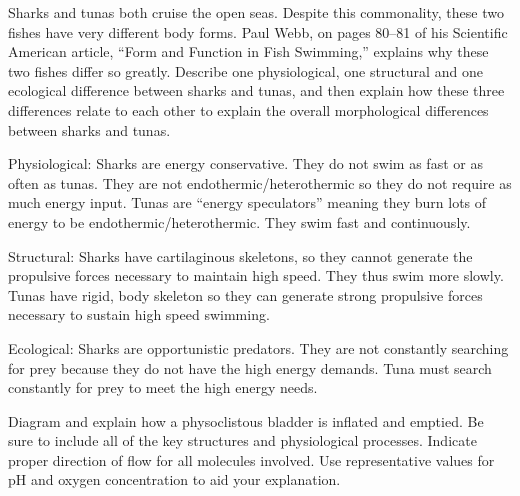 \documentclass[11pt, addpoints]{exam}
\begin{document}
\begin{questions}
\newpage

%

\question[15]
Sharks and tunas both cruise the open seas.  Despite this commonality, these two fishes have very different body forms.  Paul Webb, on pages 80--81 of his Scientific American article, “Form and Function in Fish Swimming,” explains why these two fishes differ so greatly.  Describe one physiological, one structural and one ecological difference between sharks and tunas, and then explain how these three differences relate to each other to explain the overall morphological differences between sharks and tunas.
	\begin{solution}
	Physiological: Sharks are energy conservative. They do not swim as fast or as often as tunas. They are not endothermic/heterothermic so they do not require as much energy input. Tunas are “energy speculators” meaning they burn lots of energy to be endothermic/heterothermic. They swim fast and continuously.
	
	Structural: Sharks have cartilaginous skeletons, so they cannot generate the propulsive forces necessary to maintain high speed. They thus swim more slowly. Tunas have rigid, body skeleton so they can generate strong propulsive forces necessary to sustain high speed swimming.
	
	Ecological: Sharks are opportunistic predators. They are not constantly searching for prey because they do not have the high energy demands. Tuna must search constantly for prey to meet the high energy needs.
	\end{solution}


\newpage

\question[15]
Diagram and explain how a physoclistous bladder is inflated and emptied. Be sure to include all of the key structures and physiological processes.  Indicate proper direction of flow for all molecules involved. Use representative values for pH and oxygen concentration to aid your explanation.


\end{questions}
\end{document}

